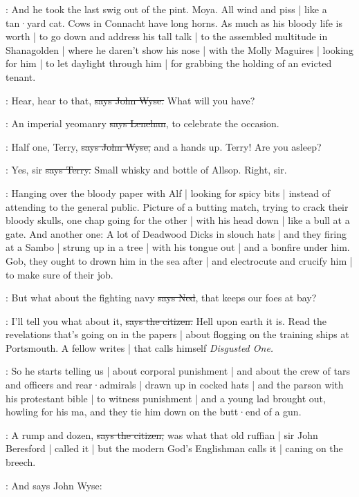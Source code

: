 \Nq:
And he took the last swig out of the pint.
Moya.
All wind and piss |
like a tan·yard cat.
Cows in Connacht have long horns.
As much as his bloody life is worth |
to go down and address his tall talk |
to the assembled multitude in Shanagolden |
where he daren't show his nose |
with the Molly Maguires |
looking for him |
to let daylight through him |
for grabbing the holding of an evicted tenant.

\johnwyse:
Hear,
hear to that,
\sout{says John Wyse.}
What will you have?

\lenehan:
An imperial yeomanry
\sout{says Lenehan},
to celebrate the occasion.

\johnwyse:
Half one,
Terry,
\sout{says John Wyse,}
and a hands up.
Terry!
Are you asleep?

\terry:
Yes,
sir
\sout{says Terry.}
Small whisky and bottle of Allsop.
Right,
sir.

\Nq:
Hanging over the bloody paper with Alf |
looking for spicy bits |
instead of attending to the general public.
Picture of a butting match,
trying to crack their bloody skulls,
one chap going for the other |
with his head down |
like a bull at a gate.
And another one:
A lot of Deadwood Dicks in slouch hats |
and they firing at a Sambo |
strung up in a tree |
with his tongue out |
and a bonfire under him.
Gob,
they ought to drown him in the sea after |
and electrocute and crucify him |
to make sure of their job.

\lambert:
But what about the fighting navy
\sout{says Ned},
that keeps our foes at bay?

\citizen:
I'll tell you what about it,
\sout{says the citizen.}
Hell upon earth it is.
Read the revelations that's going on in the papers |
about flogging on the training ships at Portsmouth.
A fellow writes |
that calls himself \emph{Disgusted One.}

\Nq:
So he starts telling us |
about corporal punishment |
and about the crew of tars and officers and rear·admirals |
drawn up in cocked hats |
and the parson with his protestant bible |
to witness punishment |
and a young lad brought out,
howling for his ma,
and they tie him down on the butt·end of a gun.

\citizen:
A rump and dozen,
\sout{says the citizen,}
was what that old ruffian |
sir John Beresford |
called it |
but the modern God's Englishman calls it |
caning on the breech.%

\Nq:
And says John Wyse:

